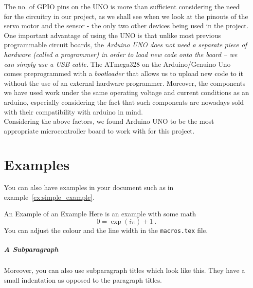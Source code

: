 The no. of GPIO pins on the UNO is more than sufficient considering the need for the circuitry in our project, as we shall see when we look at the pinouts of the servo motor and the sensor \-- the only two other devices being used in the project. \vspace{0.1cm} \linebreak
One important advantage of using the UNO is that unlike most previous programmable circuit boards, the \textit{Arduino UNO does not need a separate piece of hardware (called a programmer) in order to load new code onto the board – we can simply use a USB cable.} The ATmega328 on the Arduino/Genuino Uno comes preprogrammed with a \textit{bootloader} that allows us to upload new code to it without the use of an external hardware programmer. \vspace{0.1cm} \linebreak
Moreover, the components we have used work under the same operating voltage and current conditions as an arduino, especially considering the fact that such components are nowadays sold with their compatibility with arduino in mind.\\

Considering the above factors, we found Arduino UNO to be the most appropriate microcontroller board to work with for this project.\\

\section{Examples}
You can also have examples in your document such as in example~\ref{ex:simple_example}.
\begin{example}{An Example of an Example}
	\label{ex:simple_example}
	Here is an example with some math
	\begin{equation}
	0 = \exp(i\pi)+1\ .
	\end{equation}
	You can adjust the colour and the line width in the {\tt macros.tex} file.
\end{example}


\subparagraph{A Subparagraph} Moreover, you can also use subparagraph titles which look like this. They have a small indentation as opposed to the paragraph titles.

